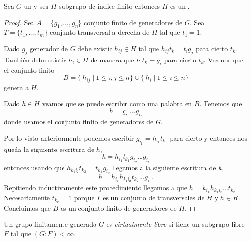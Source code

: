 \documentclass[tesis.tex]{subfiles}
\begin{document}
\begin{lema}\label{lema_subg_fg}
	Sea $G$ un \fg y sea $H$ subgrupo de índice finito entonces $H$ es un \fg.
\end{lema}
\begin{proof}
	Sea $A = \{g_1, \dots, g_n\}$ conjunto finito de generadores de $G$.
	Sea $T =\{t_1, \dots, t_m\}$ conjunto transversal a derecha de $H$ tal que $t_1=1$.
	
	Dado $g_j$ generador de $G$ debe existir $h_{ij} \in H$ tal que $h_{ij}t_{k} = t_ig_j$ para cierto $t_k$.
	También debe existir $h_i \in H$ de manera que $ h_i t_{k} = g_i$ para cierto $t_k$.
	Veamos que el conjunto finito 
	\[
	B = \{ \ h_{ ij}  \mid {1 \le i,j \le n } \} \cup \{ \ h_i \mid {1 \le i \le n} \}
	\]
	genera a $H$.
	
	Dado $h \in H$ veamos que se puede escribir como una palabra en $B$. 
	Tenemos que 
	\[
	h = g_{i_1}\dots g_{i_r}
	\]
	donde usamos el conjunto finito de generadores de $G$.
	
	Por lo visto anteriormente podemos escribir  $g_{i_1} = h_{i_1}t_{k_1}$ para cierto y entonces nos queda la siguiente escritura de $h$,
	\[
	h = h_{i_1}t_{k_1} g_{i_2}\dots g_{i_r}
	\]
	entonces usando que $h_{k_{1}i_{2}}t_{k_2} = t_{k_1}g_{i_2} $ llegamos a la siguiente escritura de $h$,
	\[
	h = h_{i_1}h_{k_{1}i_{2}}t_{k_2}\dots g_{i_r}.
	\]
	Repitiendo inductivamente este procedimiento llegamos a que $h =h_{i_1}h_{k_{1}i_{2}} \dots t_{k_r}$.
	Necesariamente $t_{k_r} = 1$ porque $T$ es un conjunto de transversales de $H$ y $h \in H$.
	Concluimos que $B$ es un conjunto finito de generadores de $H$.
	
\end{proof}

\begin{deff}
	Un grupo finitamente generado $G$ es \emph{virtualmente libre} si tiene un subgrupo libre $F$ tal que $(G:F) < \infty$.
\end{deff}
\end{document}
